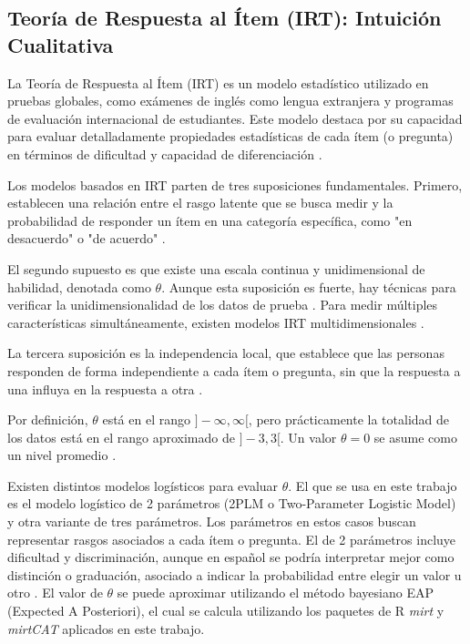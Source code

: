 \subsection{Teoría de Respuesta al Ítem (IRT): Intuición Cualitativa}

La Teoría de Respuesta al Ítem (IRT) es un modelo estadístico utilizado en pruebas globales, como exámenes de inglés como lengua extranjera y programas de evaluación internacional de estudiantes. Este modelo destaca por su capacidad para evaluar detalladamente propiedades estadísticas de cada ítem (o pregunta) en términos de dificultad y capacidad de diferenciación \cite{Linden2015HandbookOI, IRTShojima2022}.

Los modelos basados en IRT parten de tres suposiciones fundamentales. Primero, establecen una relación entre el rasgo latente que se busca medir y la probabilidad de responder un ítem en una categoría específica, como "en desacuerdo" o "de acuerdo" \cite{CalderonStatisticalIRT}.

El segundo supuesto es que existe una escala continua y unidimensional de habilidad, denotada como $\theta$. Aunque esta suposición es fuerte, hay técnicas para verificar la unidimensionalidad de los datos de prueba \cite{IRTShojima2022}. Para medir múltiples características simultáneamente, existen modelos IRT multidimensionales \cite{Reckase2009MultidimensionalIRT}.

La tercera suposición es la independencia local, que establece que las personas responden de forma independiente a cada ítem o pregunta, sin que la respuesta a una influya en la respuesta a otra \cite{CalderonStatisticalIRT}.

Por definición, $\theta$ está en el rango $]-\infty, \infty [$, pero prácticamente la totalidad de los datos está en el rango aproximado de $]-3, 3[$. Un valor $\theta = 0$ se asume como un nivel promedio \cite{IRTShojima2022}. 

Existen distintos modelos logísticos para evaluar $\theta$. El que se usa en este trabajo es el modelo logístico de 2 parámetros (2PLM o Two-Parameter Logistic Model) y otra variante de tres parámetros. Los parámetros en estos casos buscan representar rasgos asociados a cada ítem o pregunta. El de 2 parámetros incluye dificultad y discriminación, aunque en español se podría interpretar mejor como distinción o graduación, asociado a indicar la probabilidad entre elegir un valor u otro \cite{CalderonStatisticalIRT}.  El valor de $\theta$ se puede aproximar utilizando el método bayesiano EAP (Expected A Posteriori), el cual se calcula utilizando los paquetes de R \textit{mirt} \cite{RMIRT} y \textit{mirtCAT} \cite{RPackageMIRTCAT} aplicados en este trabajo. 

